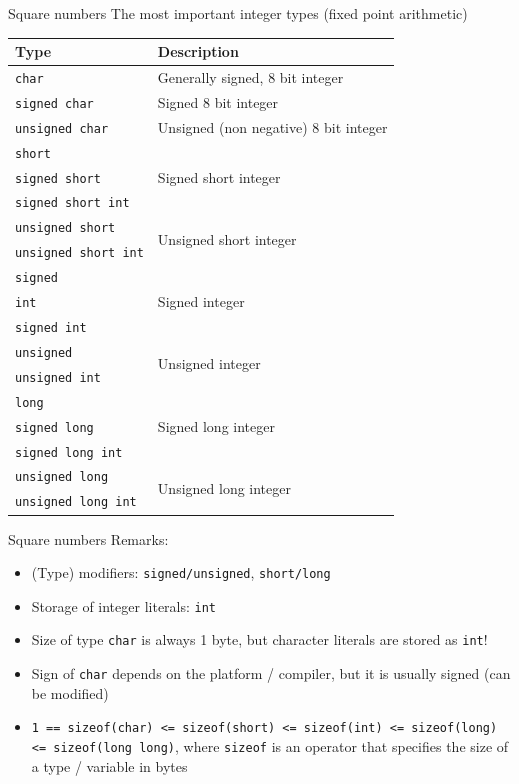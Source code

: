 \documentclass[usenames,dvipsnames,aspectratio=169]{beamer}
\begin{document}
\begin{frame}{Square numbers}
  The most important integer types (fixed point arithmetic)
  \scriptsize
  \begin{center}
    \begin{tabular}{ll}
      Type & Description \\ \hline\hline
      \texttt{char} & Generally signed, 8 bit integer \\ \hline
      \texttt{signed char} & Signed 8 bit integer \\ \hline
      \texttt{unsigned char} & Unsigned (non negative) 8 bit integer \\ \hline
      \texttt{short} & \multirow{3}{*}{Signed short integer} \\
      \texttt{signed short} & \\
      \texttt{signed short int} & \\ \hline
      \texttt{unsigned short} & \multirow{2}{*}{Unsigned short integer} \\
      \texttt{unsigned short int} & \\ \hline
      \texttt{signed} & \multirow{3}{*}{Signed integer} \\
      \texttt{int} & \\
      \texttt{signed int} & \\ \hline
      \texttt{unsigned} & \multirow{2}{*}{Unsigned integer} \\
      \texttt{unsigned int} & \\ \hline
      \texttt{long} & \multirow{3}{*}{Signed long integer} \\
      \texttt{signed long} & \\
      \texttt{signed long int} & \\ \hline
      \texttt{unsigned long} & \multirow{2}{*}{Unsigned long integer} \\
      \texttt{unsigned long int} & \\
    \end{tabular}
  \end{center}
\end{frame}

\begin{frame}{Square numbers}
  Remarks:
  \begin{itemize}
    \item (Type) modifiers: \texttt{signed/unsigned}, \texttt{short/long}
    \item Storage of integer literals: \texttt{int}
    \item Size of type \texttt{char} is always 1 byte, but character literals are stored as \texttt{int}!
    \item Sign of \texttt{char} depends on the platform / compiler, but it is usually signed (can be modified)
    \item \texttt{1 == sizeof(char) <= sizeof(short) <= sizeof(int) <= sizeof(long) <= sizeof(long long)}, where \texttt{sizeof} 
is an operator that specifies the size of a type / variable in bytes
  \end{itemize}
\end{frame}
\end{document}
